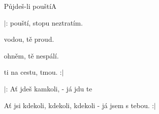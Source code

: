 \pagebreak
\begin{song}{Půjdeš-li pouští}{A}{}
\begin{SBChorus*}

$|$:  pouští,  stopu neztratím.

 vodou,  tě proud.

 ohněm,  tě nespálí.

 ti na cestu,  tmou. :$|$

$|$: Ať jdeš  kamkoli,  - já jdu te

Ať jsi kdekoli, kdekoli, kdekoli - já jsem s tebou. :$|$

\end{SBChorus*}
\end{song}
